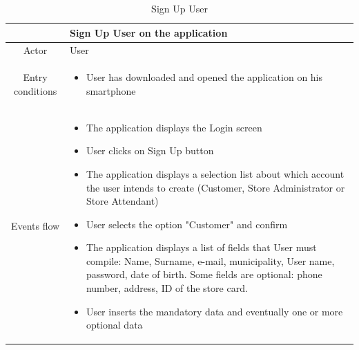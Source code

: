 \documentclass[table, 12pt]{article}
\begin{document}
\begin{longtable}{ | c | p{10cm} | }
    \caption{Sign Up User}                                                                                                                                                                                                                                                                    \\

    \hline
                     & Sign Up User on the application                                                                                                                                                                                                                                        \\
    \hline
    Actor            & User                                                                                                                                                                                                                                                                   \\
    \hline
    Entry conditions &
    \begin{itemize}
        \item User has downloaded and opened the application on his smartphone
    \end{itemize}                                                                                                                                                                                                                                                                \\
    \hline
    Events flow      & \begin{itemize}[nosep,after=\strut]
        \item The application displays the Login screen
        \item User clicks on Sign Up button
        \item The application displays a selection list about which account the user intends to create (Customer, Store Administrator or Store Attendant)
        \item User selects the option "Customer" and confirm
        \item The application displays a list of fields that User must compile: Name, Surname, e-mail, municipality, User name, password, date of birth. Some fields are optional: phone number, address, ID of the store card.
        \item User inserts the mandatory data and eventually one or more optional data

\end{itemize}
\end{longtable}
\end{document}
